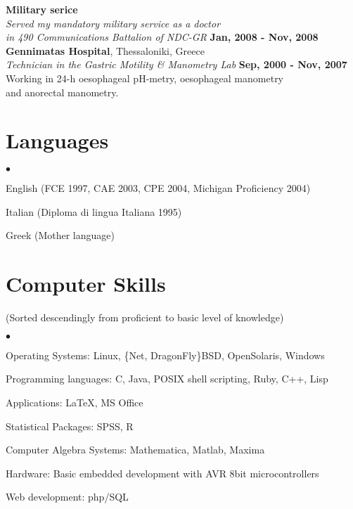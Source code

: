 \documentclass[margin,line]{res}
\newenvironment{list2}{
  \begin{list}{$\bullet$}{%
      \setlength{\itemsep}{0in}
      \setlength{\parsep}{0in} \setlength{\parskip}{0in}
      \setlength{\topsep}{0in} \setlength{\partopsep}{0in}
      \setlength{\leftmargin}{0.2in}}}{\end{list}}
\begin{document}
\begin{resume}
{\bf Military serice}\\
{\em Served my mandatory military service as a doctor\\in 490 Communications Battalion of NDC-GR}
\hfill {\bf Jan, 2008 - Nov, 2008}\\

{\bf Gennimatas Hospital}, Thessaloniki, Greece\\
{\em Technician in the Gastric Motility \& Manometry Lab} \hfill {\bf Sep, 2000 - Nov, 2007}\\
Working in 24-h oesophageal pH-metry, oesophageal manometry\\
and anorectal manometry.

\section{\sc Languages}
\begin{list2}
\item English (FCE 1997, CAE 2003, CPE 2004, Michigan Proficiency 2004)
\item Italian (Diploma di lingua Italiana 1995)
\item Greek (Mother language)
\end{list2}

\section{\sc Computer Skills}
\small (Sorted descendingly from proficient to basic level of knowledge)
\normalsize
\begin{list2}
\item Operating Systems: Linux, \{Net, DragonFly\}BSD, OpenSolaris, Windows
\item Programming languages: C, Java, POSIX shell scripting, Ruby, C++, Lisp
\item Applications: \LaTeX, MS Office
\item Statistical Packages: SPSS, R
\item Computer Algebra Systems: Mathematica, Matlab, Maxima
\item Hardware: Basic embedded development with AVR 8bit microcontrollers
\item Web development: php/SQL
\end{list2}


\end{resume}
\end{document}

